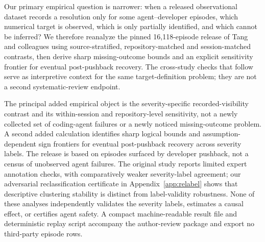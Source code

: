 Our primary empirical question is narrower: when a released observational dataset records a resolution only for some agent--developer episodes, which numerical target is observed, which is only partially identified, and which cannot be inferred? We therefore reanalyze the pinned 16,118-episode release of Tang and colleagues \cite{ref35} using source-stratified, repository-matched and session-matched contrasts, then derive sharp missing-outcome bounds and an explicit sensitivity frontier for eventual post-pushback recovery. The cross-study checks that follow serve as interpretive context for the same target-definition problem; they are not a second systematic-review endpoint.

The principal added empirical object is the severity-specific recorded-visibility contrast and its within-session and repository-level sensitivity, not a newly collected set of coding-agent failures or a newly noticed missing-outcome problem. A second added calculation identifies sharp logical bounds and assumption-dependent sign frontiers for eventual post-pushback recovery across severity labels. The release is based on episodes surfaced by developer pushback, not a census of unobserved agent failures. The original study reports limited expert annotation checks, with comparatively weaker severity-label agreement; our adversarial reclassification certificate in Appendix~\ref{app:relabel} shows that descriptive clustering stability is distinct from label-validity robustness. None of these analyses independently validates the severity labels, estimates a causal effect, or certifies agent safety. A compact machine-readable result file and deterministic replay script accompany the author-review package and export no third-party episode rows.

